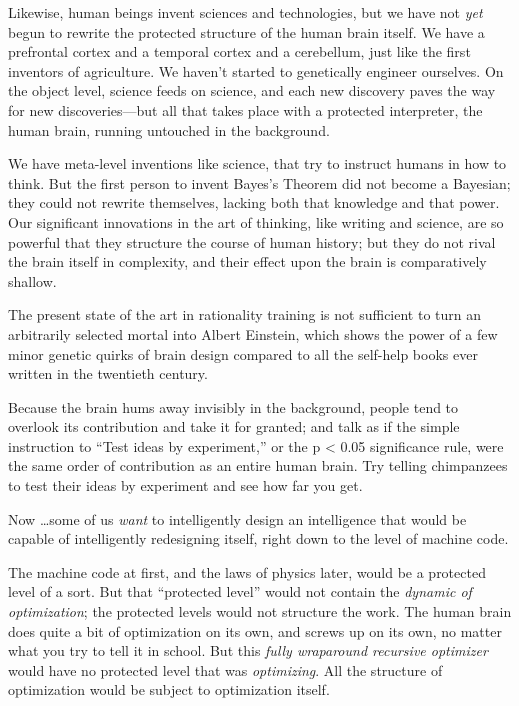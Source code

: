 {
 Likewise, human beings invent sciences and technologies, but we
have not \textit{yet} begun to rewrite the protected structure of the
human brain itself. We have a prefrontal cortex and a temporal cortex
and a cerebellum, just like the first inventors of agriculture. We
haven't started to genetically engineer ourselves. On
the object level, science feeds on science, and each new discovery
paves the way for new discoveries---but all that takes place with a
protected interpreter, the human brain, running untouched in the
background.}

{
 We have meta-level inventions like science, that try to instruct
humans in how to think. But the first person to invent
Bayes's Theorem did not become a Bayesian; they could
not rewrite themselves, lacking both that knowledge and that power. Our
significant innovations in the art of thinking, like writing and
science, are so powerful that they structure the course of human
history; but they do not rival the brain itself in complexity, and
their effect upon the brain is comparatively shallow.}

{
 The present state of the art in rationality training is not
sufficient to turn an arbitrarily selected mortal into Albert Einstein,
which shows the power of a few minor genetic quirks of brain design
compared to all the self-help books ever written in the twentieth
century.}

{
 Because the brain hums away invisibly in the background, people
tend to overlook its contribution and take it for granted; and talk as
if the simple instruction to ``Test ideas by
experiment,'' or the p {\textless} 0.05 significance
rule, were the same order of contribution as an entire human brain. Try
telling chimpanzees to test their ideas by experiment and see how far
you get.}

{
 Now \ldots some of us \textit{want} to intelligently design an
intelligence that would be capable of intelligently redesigning itself,
right down to the level of machine code.}

{
 The machine code at first, and the laws of physics later, would be
a protected level of a sort. But that ``protected
level'' would not contain the \textit{dynamic of
optimization}; the protected levels would not structure the work. The
human brain does quite a bit of optimization on its own, and screws up
on its own, no matter what you try to tell it in school. But this
\textit{fully wraparound recursive optimizer} would have no protected
level that was \textit{optimizing}. All the structure of optimization
would be subject to optimization itself.}

